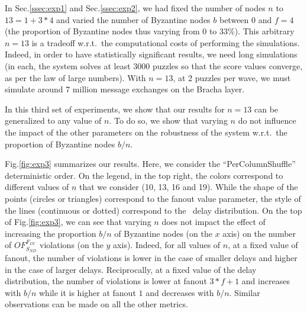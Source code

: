 In Sec.\ref{ssec:exp1} and Sec.\ref{ssec:exp2}, we had fixed the number of nodes $n$ to $13 = 1 + 3*4$ and varied the number of Byzantine nodes $b$ between $0$ and $f=4$ (the proportion of Byzantine nodes thus varying from $0$ to $33\%$).
This arbitrary $n=13$ is a tradeoff w.r.t.~the computational costs of performing the simulations.
Indeed, in order to have statistically significant results, we need long simulations (in each, the system solves at least 3000 puzzles so that the score values converge, as per the law of large numbers). 
With $n=13$, at 2 puzzles per wave, we must simulate around $7$ million message exchanges on the Bracha layer.

In this third set of experiments, we show that our results for $n=13$ can be generalized to any value of $n$. To do so, we show that varying $n$ do not influence the impact of the other parameters on the robustness of the system w.r.t.~the proportion of Byzantine nodes $b/n$.

Fig.\ref{fig:exp3} summarizes our results.
Here, we consider the ``PerColumnShuffle'' deterministic order.
On the legend, in the top right, the colors correspond to different values of $n$ that we consider (10, 13, 16 and 19).
While the shape of the points (circles or triangles) correspond to the fanout value parameter,
the style of the lines (continuous or dotted) correspond to the \faClockO~delay distribution.
On the top of Fig.\ref{fig:exp3}, we can see that varying $n$ does not impact the effect of increasing the proportion $b/n$ of Byzantine nodes (on the $x$ axis) on the number of $OF_{S_{ND}}^{F_{IN}}$ violations (on the $y$ axis).
Indeed, for all values of $n$, at a fixed value of fanout, the number of violations is lower in the case of smaller delays and higher in the case of larger delays.
Reciprocally, at a fixed value of the delay distribution, the number of violations is lower at fanout $3*f+1$ and increases with $b/n$ while it is higher at fanout $1$ and decreases with $b/n$.
Similar observations can be made on all the other metrics.

















